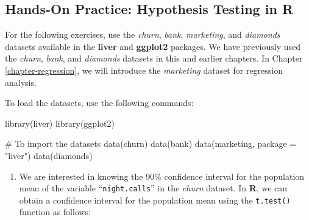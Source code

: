 \documentclass[
  11pt,
]{book}
\makeatletter
\newenvironment{Shaded}{}{}
\newcommand{\AttributeTok}[1]{#1}
\newcommand{\CommentTok}[1]{\textcolor[rgb]{0.36,0.36,0.36}{#1}}
\newcommand{\DecValTok}[1]{#1}
\newcommand{\FloatTok}[1]{#1}
\newcommand{\FunctionTok}[1]{#1}
\newcommand{\NormalTok}[1]{#1}
\newcommand{\SpecialCharTok}[1]{\textcolor[rgb]{0.39,0.39,0.39}{#1}}
\newcommand{\StringTok}[1]{\textcolor[rgb]{0.39,0.39,0.39}{#1}}
\providecommand{\tightlist}{%
  \setlength{\itemsep}{0pt}\setlength{\parskip}{0pt}}
\newenvironment{kframe}{%
\medskip{}
\setlength{\fboxsep}{.8em}
 \def\at@end@of@kframe{}%
 \ifinner\ifhmode%
  \def\at@end@of@kframe{\end{minipage}}%
  \begin{minipage}{\columnwidth}%
 \fi\fi%
 \def\FrameCommand##1{\hskip\@totalleftmargin \hskip-\fboxsep
 \colorbox{shadecolor}{##1}\hskip-\fboxsep
     \hskip-\linewidth \hskip-\@totalleftmargin \hskip\columnwidth}%
 \MakeFramed {\advance\hsize-\width
   \@totalleftmargin\z@ \linewidth\hsize
   \@setminipage}}%
 {\par\unskip\endMakeFramed%
 \at@end@of@kframe}
\renewenvironment{Shaded}{\begin{kframe}}{\end{kframe}}
\theoremstyle{definition}
\theoremstyle{definition}
\theoremstyle{definition}
\theoremstyle{definition}
\theoremstyle{remark}
\makeatother
\begin{document}
\subsection*{Hands-On Practice: Hypothesis Testing in R}\label{hands-on-practice-hypothesis-testing-in-r}


For the following exercises, use the \emph{churn}, \emph{bank}, \emph{marketing}, and \emph{diamonds} datasets available in the \textbf{liver} and \textbf{ggplot2} packages. We have previously used the \emph{churn}, \emph{bank}, and \emph{diamonds} datasets in this and earlier chapters. In Chapter \ref{chapter-regression}, we will introduce the \emph{marketing} dataset for regression analysis.

To load the datasets, use the following commands:

\begin{Shaded}
\begin{Highlighting}[]
\FunctionTok{library}\NormalTok{(liver)}
\FunctionTok{library}\NormalTok{(ggplot2)   }

\CommentTok{\# To import the datasets}
\FunctionTok{data}\NormalTok{(churn)  }
\FunctionTok{data}\NormalTok{(bank)  }
\FunctionTok{data}\NormalTok{(marketing, }\AttributeTok{package =} \StringTok{"liver"}\NormalTok{)  }
\FunctionTok{data}\NormalTok{(diamonds)  }
\end{Highlighting}
\end{Shaded}

\begin{enumerate}
\def\labelenumi{\arabic{enumi}.}
\setcounter{enumi}{9}
\tightlist
\item
  We are interested in knowing the 90\% confidence interval for the population mean of the variable ``\texttt{night.calls}'' in the \emph{churn} dataset. In \textbf{R}, we can obtain a confidence interval for the population mean using the \texttt{t.test()} function as follows:
\end{enumerate}

\begin{Shaded}
\end{Shaded}
\end{document}
